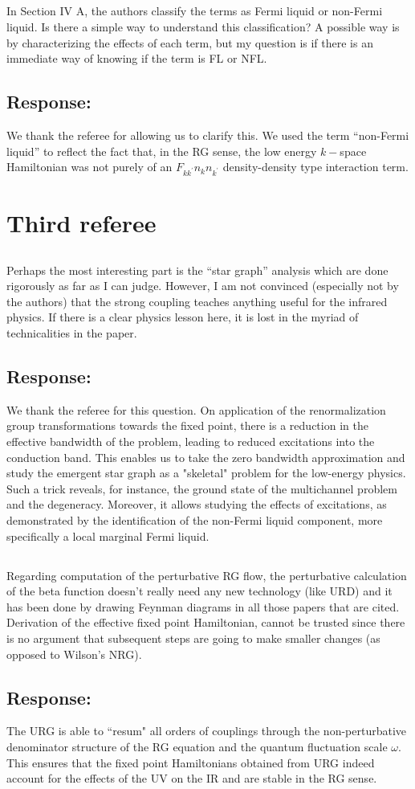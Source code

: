 \documentclass{article}
\newcommand{\response}[1]{{\color{blue}\subsection*{Response:}{#1}}}
\newcommand{\point}[1]{\subsection{}{#1}}
\begin{document}
\point{
In Section IV A, the authors classify the terms as Fermi liquid or non-Fermi liquid. Is there a simple way to understand this classification? A possible way is by characterizing the effects of each term, but my question is if there is an immediate way of knowing if the term is FL or NFL.}

\response{ We thank the referee for allowing us to clarify this. We used the term “non-Fermi liquid” to reflect the fact that, in the RG sense, the low energy $k−$space Hamiltonian was not purely of an $F_{kk^\prime} n_k n_{k^\prime}$ density-density type interaction term.} 

\section{Third referee}

\point{
Perhaps the most interesting part is the “star graph” analysis which
are done rigorously as far as I can judge. However, I am not convinced
(especially not by the authors) that the strong coupling teaches
anything useful for the infrared physics. If there is a clear physics
lesson here, it is lost in the myriad of technicalities in the paper.
}

\response{We thank the referee for this question. On application of the renormalization group transformations towards the fixed point, there is a reduction in the effective bandwidth of the problem, leading to reduced excitations into the conduction band. This enables us to take the zero bandwidth approximation and study the emergent star graph as a "skeletal" problem for the low-energy physics. Such a trick reveals, for instance, the ground state of the multichannel problem and the degeneracy. Moreover, it allows studying the effects of excitations, as demonstrated by the identification of the non-Fermi liquid component, more specifically a local marginal Fermi liquid.
}

\point{
Regarding computation of the perturbative RG flow, the perturbative
calculation of the beta function doesn’t really need any new
technology (like URD) and it has been done by drawing Feynman diagrams
in all those papers that are cited. Derivation of the effective fixed
point Hamiltonian, cannot be trusted since there is no argument that
subsequent steps are going to make smaller changes (as opposed to
Wilson’s NRG).
}

\response{
The URG is able to ``resum" all orders of couplings through the non-perturbative denominator structure of the RG equation and the quantum fluctuation scale \(\omega\). This ensures that the fixed point Hamiltonians obtained from URG indeed account for the effects of the UV on the IR and are stable in the RG sense.
}
\end{document}
